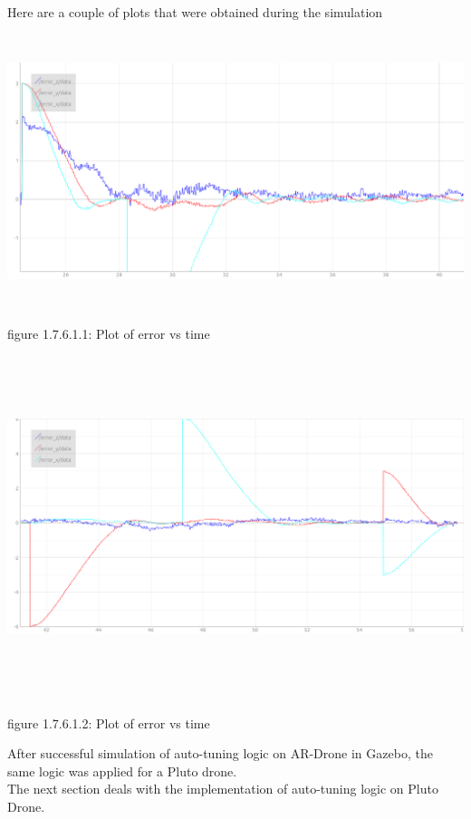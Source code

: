 \documentclass[a4paper,12pt,oneside]{book}
\begin{document}
Here are a couple of plots that were obtained during the simulation\\
\begin{flushleft}
\includegraphics[width = 15cm , height= 8cm]{auto-tuning-ARDrone.png}
\begin{center}
    figure 1.7.6.1.1: Plot of error vs time
\end{center}
\includegraphics[width = 15cm , height= 10cm]{auto-tuning-ARDrone_2.png}
\begin{center}
    figure 1.7.6.1.2: Plot of error vs time
\end{center}
\end{flushleft}

After successful simulation of auto-tuning logic on AR-Drone in Gazebo, the same logic was applied for a Pluto drone.\\
The next section deals with the implementation of auto-tuning logic on Pluto Drone.
\end{document}

